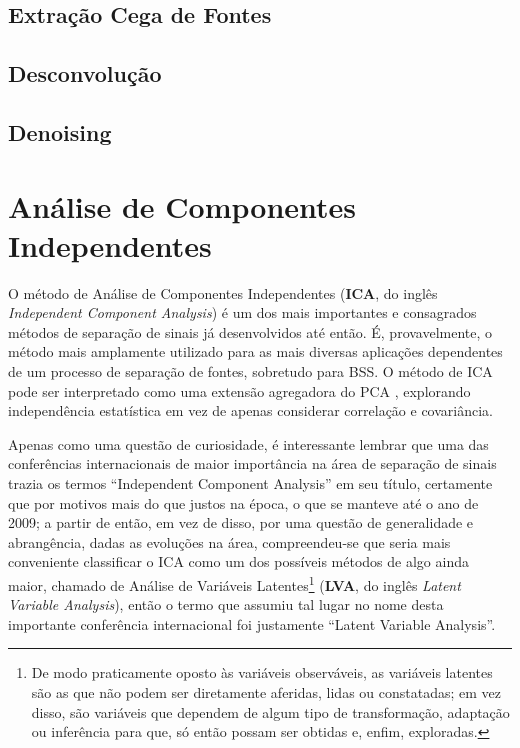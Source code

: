 \subsection{Extração Cega de Fontes}
\label{subsec:bss_bse}





\subsection{Desconvolução}
\label{subsec:bss_deconvolution}


\subsection{Denoising}
\label{subsec:bss_denoising}



\section{Análise de Componentes Independentes}
\label{sec:bss_ica}

O método de Análise de Componentes Independentes (\textbf{ICA}, do inglês \textit{Independent Component Analysis}) é um dos mais importantes e consagrados métodos de separação de sinais já desenvolvidos até então. É, provavelmente, o método mais amplamente utilizado para as mais diversas aplicações dependentes de um processo de separação de fontes, sobretudo para BSS. O método de ICA pode ser interpretado como uma extensão agregadora do PCA \citep{COMON1994287}, explorando independência estatística em vez de apenas considerar correlação e covariância.


Apenas como uma questão de curiosidade, é interessante lembrar que uma das conferências internacionais de maior importância na área de separação de sinais trazia os termos ``Independent Component Analysis'' em seu título, certamente que por motivos mais do que justos na época, o que se manteve até o ano de 2009; a partir de então, em vez de disso, por uma questão de generalidade e abrangência, dadas as evoluções na área, compreendeu-se que seria mais conveniente classificar o ICA como um dos possíveis métodos de algo ainda maior, chamado de Análise de Variáveis Latentes\footnote{De modo praticamente oposto às variáveis observáveis, as variáveis latentes são as que não podem ser diretamente aferidas, lidas ou constatadas; em vez disso, são variáveis que dependem de algum tipo de transformação, adaptação ou inferência para que, só então possam ser obtidas e, enfim, exploradas.} (\textbf{LVA}, do inglês \textit{Latent Variable Analysis}), então o termo que assumiu tal lugar no nome desta importante conferência internacional foi justamente ``Latent Variable Analysis''.

